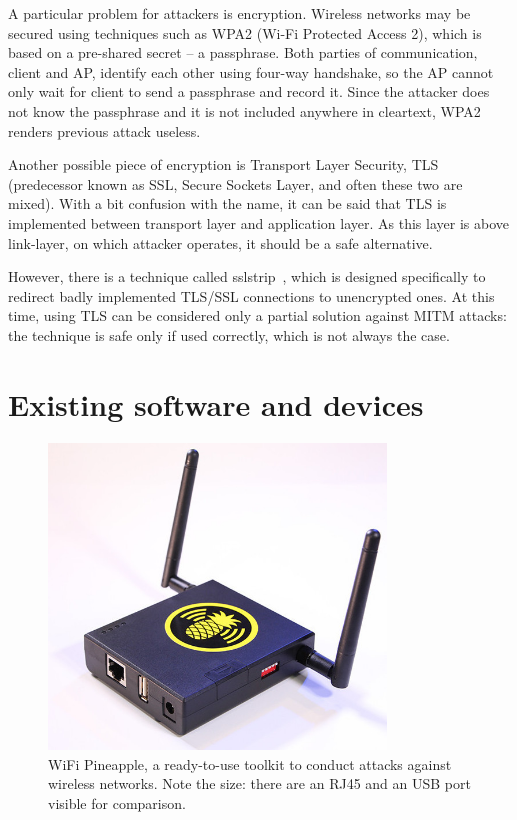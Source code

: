 \documentclass[12pt,a4paper,oneside,pdftex]{report}
\begin{document}
A particular problem for attackers is encryption. Wireless networks may be secured using techniques such as WPA2 (Wi-Fi Protected Access 2), which is based on a pre-shared secret -- a passphrase. Both parties of communication, client and AP, identify each other using four-way handshake, so the AP cannot only wait for client to send a passphrase and record it. Since the attacker does not know the passphrase and it is not included anywhere in cleartext, WPA2 renders previous attack useless.

Another possible piece of encryption is Transport Layer Security, TLS (predecessor known as SSL, Secure Sockets Layer, and often these two are mixed). With a bit confusion with the name, it can be said that TLS is implemented between transport layer and application layer. As this layer is above link-layer, on which attacker operates, it should be a safe alternative.

However, there is a technique called sslstrip~\cite{marlinspike2009new}, which is designed specifically to redirect badly implemented TLS/SSL connections to unencrypted ones. At this time, using TLS can be considered only a partial solution against MITM attacks: the technique is safe only if used correctly, which is not always the case.

\section{Existing software and devices}

\begin{figure}
    \center
    \includegraphics[width=0.8\textwidth]{images/wifi_pineapple_pic}
    \caption{WiFi Pineapple, a ready-to-use toolkit to conduct attacks against wireless networks. Note the size: there are an RJ45 and an USB port visible for comparison.}
    \label{wifi_pineapple_pic}
\end{figure}
\end{document}
